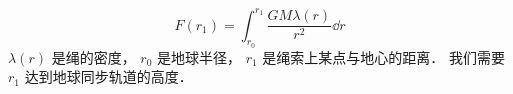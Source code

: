 
\begin{equation}
F(r_1) = \int_{r_0}^{r_1} \frac{GM\lambda(r)}{r^2} \dd{r}
\end{equation}
$\lambda(r)$ 是绳的密度， $r_0$ 是地球半径， $r_1$ 是绳索上某点与地心的距离． 我们需要 $r_1$ 达到地球同步轨道的高度．


